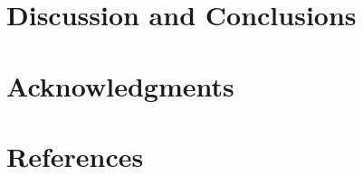 \documentclass[final,5p,times,twocolumn]{elsarticle}
\begin{document}
\section{Discussion and Conclusions} 


\section*{Acknowledgments}

\section*{References}










\end{document}
